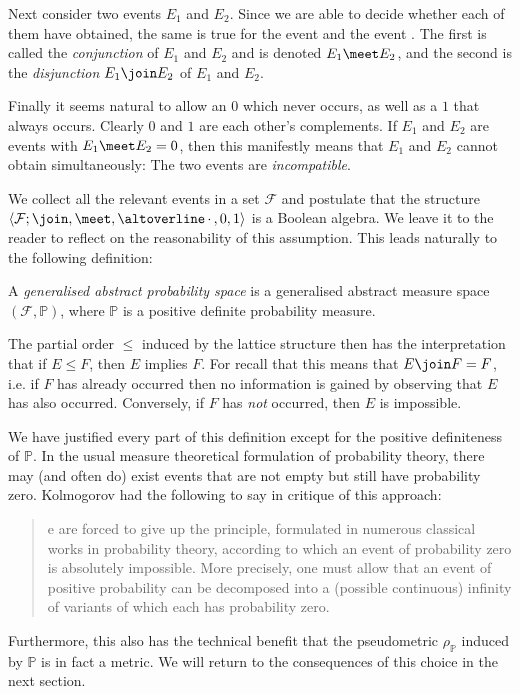 \documentclass[article, a4paper, 11pt, oneside]{memoir}
\numberwithin{equation}{chapter}
\newcommand{\calF}{\mathcal{F}}
\renewcommand{\P}{\mathbb{P}}
\begin{document}
Next consider two events $E_1$ and $E_2$. Since we are able to decide whether each of them have obtained, the same is true for the event  and the event . The first is called the \emph{conjunction} of $E_1$ and $E_2$ and is denoted $E_1 \meet E_2$, and the second is the \emph{disjunction} $E_1 \join E_2$ of $E_1$ and $E_2$.

Finally it seems natural to allow an  $0$ which never occurs, as well as a  $1$ that always occurs. Clearly $0$ and $1$ are each other's complements. If $E_1$ and $E_2$ are events with $E_1 \meet E_2 = 0$, then this manifestly means that $E_1$ and $E_2$ cannot obtain simultaneously: The two events are \emph{incompatible}.

We collect all the relevant events in a set $\calF$ and postulate that the structure $\langle \calF; \join, \meet, \compl{\,\cdot\,\vphantom{e}}, 0, 1 \rangle$ is a Boolean algebra. We leave it to the reader to reflect on the reasonability of this assumption. This leads naturally to the following definition:

\begin{definition}
    A \emph{generalised abstract probability space} is a generalised abstract measure space $(\calF, \P)$, where $\P$ is a positive definite probability measure.
\end{definition}
%
The partial order $\leq$ induced by the lattice structure then has the interpretation that if $E \leq F$, then $E$ implies $F$. For recall that this means that $E \join F = F$, i.e. if $F$ has already occurred then no information is gained by observing that $E$ has also occurred. Conversely, if $F$ has \emph{not} occurred, then $E$ is impossible.

We have justified every part of this definition except for the positive definiteness of $\P$. In the usual measure theoretical formulation of probability theory, there may (and often do) exist events that are not empty but still have probability zero. Kolmogorov had the following to say in critique of this approach:
%
\blockquote[\cite{kolmogorov1995}]{%
    e are forced to give up the principle, formulated in numerous classical works in probability theory, according to which an event of probability zero is absolutely impossible. More precisely, one must allow that an event of positive probability can be decomposed into a (possible continuous) infinity of variants of which each has probability
    zero.%
}
%
Furthermore, this also has the technical benefit that the pseudometric $\rho_\P$ induced by $\P$ is in fact a metric. We will return to the consequences of this choice in the next section.
\end{document}
